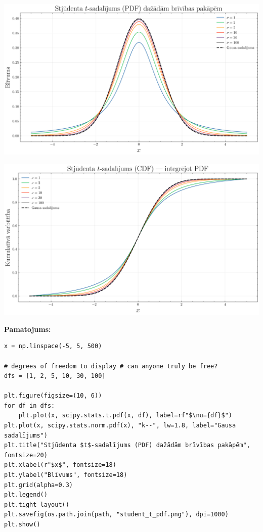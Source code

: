 \documentclass[12pt]{article}
\begin{document}
{\begin{center}
    \includegraphics[width=1\linewidth]{student_t_pdf.png}
\end{center}

\begin{center}
    \includegraphics[width=1\linewidth]{student_t_cdf.png}
\end{center}
\textbf{Pamatojums:}
\begin{verbatim}
x = np.linspace(-5, 5, 500)

# degrees of freedom to display # can anyone truly be free?
dfs = [1, 2, 5, 10, 30, 100]

plt.figure(figsize=(10, 6))
for df in dfs:
    plt.plot(x, scipy.stats.t.pdf(x, df), label=rf"$\nu={df}$")
plt.plot(x, scipy.stats.norm.pdf(x), "k--", lw=1.8, label="Gausa sadalījums")
plt.title("Stjūdenta $t$-sadalījums (PDF) dažādām brīvības pakāpēm", fontsize=20)
plt.xlabel(r"$x$", fontsize=18)
plt.ylabel("Blīvums", fontsize=18)
plt.grid(alpha=0.3)
plt.legend()
plt.tight_layout()
plt.savefig(os.path.join(path, "student_t_pdf.png"), dpi=1000)
plt.show()


\end{verbatim}}
\end{document}
